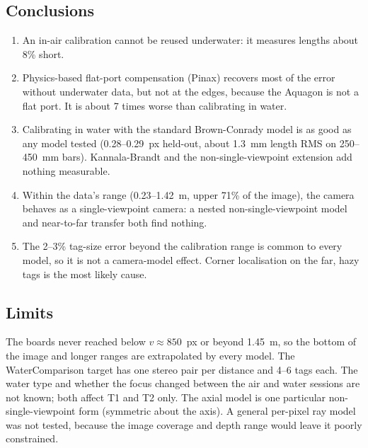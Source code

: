 \subsection{Conclusions}
\begin{enumerate}
\item An in-air calibration cannot be reused underwater: it measures lengths about 8\% short.
\item Physics-based flat-port compensation (Pinax) recovers most of the error without underwater data, but
not at the edges, because the Aquagon is not a flat port. It is about 7 times worse than calibrating in water.
\item Calibrating in water with the standard Brown-Conrady model is as good as any model tested
(0.28--0.29~px held-out, about 1.3~mm length RMS on 250--450~mm bars). Kannala-Brandt and the
non-single-viewpoint extension add nothing measurable.
\item Within the data's range (0.23--1.42~m, upper 71\% of the image), the camera behaves as a
single-viewpoint camera: a nested non-single-viewpoint model and near-to-far transfer both find nothing.
\item The 2--3\% tag-size error beyond the calibration range is common to every model, so it is not a
camera-model effect. Corner localisation on the far, hazy tags is the most likely cause.
\end{enumerate}

\subsection{Limits}
The boards never reached below $v \approx 850$~px or beyond 1.45~m, so the bottom of the image and longer
ranges are extrapolated by every model. The WaterComparison target has one stereo pair per distance and
4--6 tags each. The water type and whether the focus changed between the air and water sessions are not
known; both affect T1 and T2 only. The axial model is one particular non-single-viewpoint form (symmetric
about the axis). A general per-pixel ray model was not tested, because the image coverage and depth range
would leave it poorly constrained.
